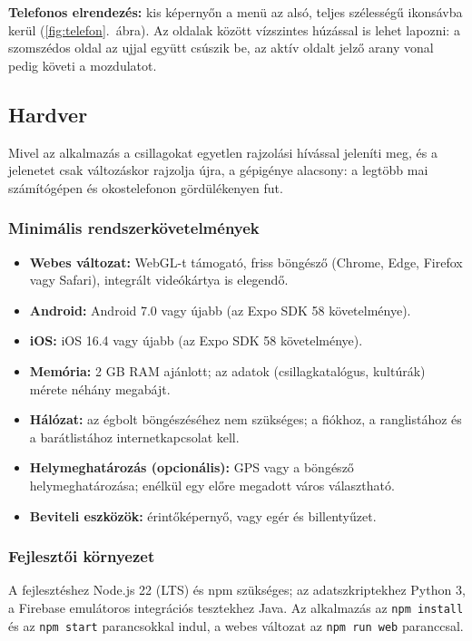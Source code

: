 \documentclass[12pt,a4paper]{article}
\newcommand{\kod}[1]{\texttt{\small #1}}
\begin{document}
\textbf{Telefonos elrendezés:} kis képernyőn a menü az alsó, teljes szélességű ikonsávba kerül
(\ref{fig:telefon}.~ábra). Az oldalak között vízszintes húzással is lehet lapozni: a
szomszédos oldal az ujjal együtt csúszik be, az aktív oldalt jelző arany vonal pedig követi a
mozdulatot.

\FloatBarrier
\subsection{Hardver}

Mivel az alkalmazás a csillagokat egyetlen rajzolási hívással jeleníti meg, és a jelenetet
csak változáskor rajzolja újra, a gépigénye alacsony: a legtöbb mai számítógépen és okostelefonon
gördülékenyen fut.

\subsubsection*{Minimális rendszerkövetelmények}

\begin{itemize}
  \item \textbf{Webes változat:} WebGL-t támogató, friss böngésző (Chrome, Edge, Firefox vagy
        Safari), integrált videókártya is elegendő.
  \item \textbf{Android:} Android 7.0 vagy újabb (az Expo SDK 58 követelménye).
  \item \textbf{iOS:} iOS 16.4 vagy újabb (az Expo SDK 58 követelménye).
  \item \textbf{Memória:} 2 GB RAM ajánlott; az adatok (csillagkatalógus, kultúrák) mérete
        néhány megabájt.
  \item \textbf{Hálózat:} az égbolt böngészéséhez nem szükséges; a fiókhoz, a ranglistához és a
        barátlistához internetkapcsolat kell.
  \item \textbf{Helymeghatározás (opcionális):} GPS vagy a böngésző helymeghatározása; enélkül
        egy előre megadott város választható.
  \item \textbf{Beviteli eszközök:} érintőképernyő, vagy egér és billentyűzet.
\end{itemize}

\subsubsection*{Fejlesztői környezet}

A fejlesztéshez Node.js 22 (LTS) és npm szükséges; az adatszkriptekhez Python 3, a Firebase
emulátoros integrációs tesztekhez Java. Az alkalmazás az \kod{npm install} és az \kod{npm start}
parancsokkal indul, a webes változat az \kod{npm run web} paranccsal.
\end{document}
